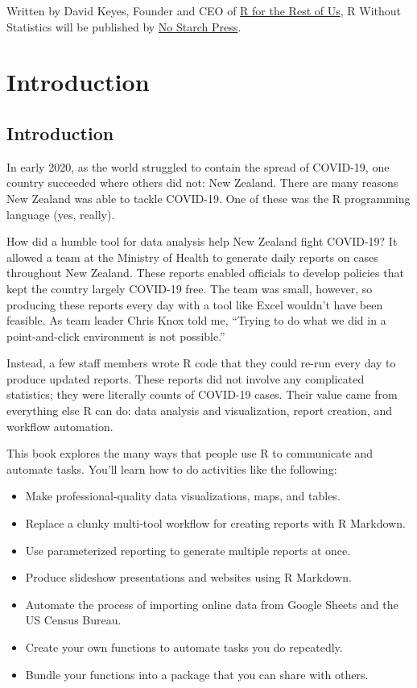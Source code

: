 \documentclass[
]{book}
\begin{document}
Written by David Keyes, Founder and CEO of \href{https://rfortherestofus.com/}{R for the Rest of Us}, R Without Statistics will be published by \href{https://nostarch.com/}{No Starch Press}.

\hypertarget{part-introduction}{%
\part*{Introduction}\label{part-introduction}}

\hypertarget{introduction}{%
\chapter*{Introduction}\label{introduction}}

In early 2020, as the world struggled to contain the spread of COVID-19, one country succeeded where others did not: New Zealand. There are many reasons New Zealand was able to tackle COVID-19. One of these was the R programming language (yes, really).

How did a humble tool for data analysis help New Zealand fight COVID-19? It allowed a team at the Ministry of Health to generate daily reports on cases throughout New Zealand. These reports enabled officials to develop policies that kept the country largely COVID-19 free. The team was small, however, so producing these reports every day with a tool like Excel wouldn't have been feasible. As team leader Chris Knox told me, ``Trying to do what we did in a point-and-click environment is not possible.''

Instead, a few staff members wrote R code that they could re-run every day to produce updated reports. These reports did not involve any complicated statistics; they were literally counts of COVID-19 cases. Their value came from everything else R can do: data analysis and visualization, report creation, and workflow automation.

This book explores the many ways that people use R to communicate and automate tasks. You'll learn how to do activities like the following:

\begin{itemize}
\item
  Make professional-quality data visualizations, maps, and tables.
\item
  Replace a clunky multi-tool workflow for creating reports with R Markdown.
\item
  Use parameterized reporting to generate multiple reports at once.
\item
  Produce slideshow presentations and websites using R Markdown.
\item
  Automate the process of importing online data from Google Sheets and the US Census Bureau.
\item
  Create your own functions to automate tasks you do repeatedly.
\item
  Bundle your functions into a package that you can share with others.
\end{itemize}
\end{document}
